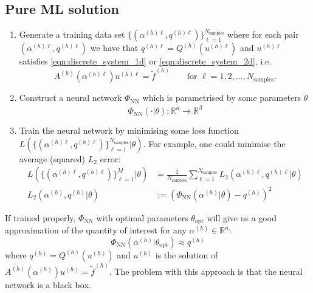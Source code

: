 \documentclass[11pt]{article}
\begin{document}
\subsection{Pure ML solution}\label{sec:pure_ml}
\begin{enumerate}
    \item Generate a training data set $\{(\alpha^{(h)\ell},q^{(h)\ell})\}_{\ell=1}^{N_{\text{samples}}}$ where for each pair $(\alpha^{(h)\ell},q^{(h)\ell})$ we have that $q^{(h)\ell}=Q^{(h)}(u^{(h)\ell})$ and $u^{(h)\ell}$ satisfies \eqref{eqn:discrete_system_1d} or \eqref{eqn:discrete_system_2d}, i.e. 
    \begin{equation}
        A^{(h)}(\alpha^{(h)\ell})u^{(h)\ell}=\widetilde{f}^{(h)}
        \qquad\text{for $\ell=1,2,\dots,N_{\text{samples}}$.}
    \end{equation}
    \item Construct a neural network $\Phi_{\text{NN}}$ which is parametrised by some parameters $\theta$
    \begin{equation}
        \Phi_{\text{NN}}(\cdot|\theta) : \mathbb{R}^{\widetilde{n}} \rightarrow \mathbb{R}^{\beta}
    \end{equation}
    \item Train the neural network by minimising some loss function $L(\{(\alpha^{(h)\ell},q^{(h)\ell})\}_{\ell=1}^{N_{\text{samples}}}|\theta)$.
For example, one could minimise the average (squared) $L_2$ error:
\begin{equation}
    \begin{aligned}
    L(\{(\alpha^{(h)\ell},q^{(h)\ell})\}_{\ell=1}^{M}|\theta) &= \frac{1}{N_{\text{samples}}}\sum_{\ell=1}^{N_{\text{samples}}} L_2(\alpha^{(h)\ell},q^{(h)\ell}|\theta)\\
    L_2(\alpha^{(h)},q^{(h)}|\theta) &:= \left(\Phi_{\text{NN}}(\alpha^{(h)}|\theta) - q^{(h)}\right)^2
    \end{aligned}
\end{equation}
\end{enumerate}
If trained properly, $\Phi_{\text{NN}}$ with optimal parameters $\theta_{\text{opt}}$ will give us a good approximation of the quantity of interest for any $\alpha^{(h)}\in\mathbb{R}^{n}$:
\begin{equation}
    \Phi_{\text{NN}}(\alpha^{(h)}|\theta_{\text{opt}}) \approx q^{(h)}
\end{equation}
where $q^{(h)}=Q^{(h)}(u^{(h)})$ and $u^{(h)}$ is the solution of $A^{(h)}(\alpha^{(h)}) u^{(h)}=\widetilde{f}^{(h)}$.
The problem with this approach is that the neural network is a black box.
\end{document}
